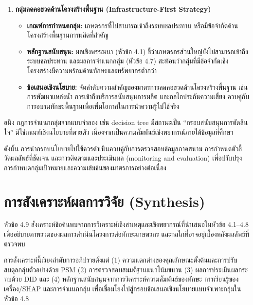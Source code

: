 \begin{enumerate}
\begin{itemize}
\item \textbf{ข้อเสนอเชิงนโยบาย:} จัดโปรแกรมพัฒนาทักษะดิจิทัลสำหรับผู้เริ่มต้น โดยเน้นการเรียนรู้แบบลงมือปฏิบัติ การใช้เครื่องมือที่ไม่ซับซ้อน และการสนับสนุนพี่เลี้ยงในพื้นที่ ก่อนเชื่อมต่อสู่เนื้อหาขั้นสูงในระยะถัดไป

\end{itemize}

\item \textbf{กลุ่มลดคอขวดด้านโครงสร้างพื้นฐาน (Infrastructure-First Strategy)}

\begin{itemize}
\item \textbf{เกณฑ์การกำหนดกลุ่ม:} เกษตรกรที่ไม่สามารถเข้าถึงระบบชลประทาน หรือมีข้อจำกัดด้านโครงสร้างพื้นฐานการผลิตที่สำคัญ

\item \textbf{หลักฐานสนับสนุน:} ผลเชิงพรรณนา (หัวข้อ 4.1) ชี้ว่าเกษตรกรส่วนใหญ่ยังไม่สามารถเข้าถึงระบบชลประทาน และผลการจำแนกกลุ่ม (หัวข้อ 4.7) สะท้อนว่ากลุ่มที่มีข้อจำกัดเชิงโครงสร้างมีความพร้อมด้านทักษะและทรัพยากรต่ำกว่า

\item \textbf{ข้อเสนอเชิงนโยบาย:} จัดลำดับความสำคัญของมาตรการลดคอขวดด้านโครงสร้างพื้นฐาน เช่น การพัฒนาแหล่งน้ำ การเข้าถึงบริการสนับสนุนการผลิต และกลไกประกันความเสี่ยง ควบคู่กับการอบรมทักษะพื้นฐานเพื่อเพิ่มโอกาสในการนำความรู้ไปใช้จริง

\end{itemize}

\end{enumerate}

อนึ่ง กฎการจำแนกกลุ่มจากแบบจำลอง เช่น decision tree มีสถานะเป็น “กรอบสนับสนุนการตัดสินใจ” มิใช่เกณฑ์เชิงนโยบายที่ตายตัว เนื่องจากเป็นความสัมพันธ์เชิงพยากรณ์ภายใต้ข้อมูลที่ศึกษา

ดังนั้น การนำกรอบนโยบายไปใช้ควรดำเนินควบคู่กับการตรวจสอบข้อมูลภาคสนาม การกำหนดตัวชี้วัดผลลัพธ์ที่ชัดเจน และการติดตามและประเมินผล (monitoring and evaluation) เพื่อปรับปรุงการกำหนดกลุ่มเป้าหมายและความเข้มข้นของมาตรการอย่างต่อเนื่อง

\section{การสังเคราะห์ผลการวิจัย (Synthesis)}

หัวข้อ 4.9 สังเคราะห์ข้อค้นพบจากการวิเคราะห์เชิงสาเหตุและเชิงพยากรณ์ที่นำเสนอในหัวข้อ 4.1--4.8 เพื่ออธิบายภาพรวมของผลการดำเนินโครงการต่อทักษะเกษตรกร และกลไกที่อาจอยู่เบื้องหลังผลลัพธ์ที่ตรวจพบ

การสังเคราะห์นี้เรียงลำดับการอภิปรายตั้งแต่ (1) ความแตกต่างของคุณลักษณะตั้งต้นและการปรับสมดุลกลุ่มตัวอย่างด้วย PSM (2) การตรวจสอบสมมติฐานแนวโน้มขนาน (3) ผลการประเมินผลกระทบด้วย DID และ (4) หลักฐานสนับสนุนจากการวิเคราะห์ความสัมพันธ์ของทักษะ การเรียนรู้ของเครื่อง/SHAP และการจำแนกกลุ่ม เพื่อเชื่อมโยงไปสู่กรอบข้อเสนอเชิงนโยบายแบบจำเพาะกลุ่มในหัวข้อ 4.8

